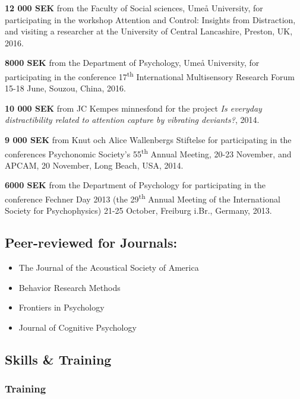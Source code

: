 \documentclass[]{article}
\begin{document}
\textbf{12 000 SEK} from the Faculty of Social sciences, Umeå
University, for participating in the workshop Attention and Control:
Insights from Distraction, and visiting a researcher at the University
of Central Lancashire, Preston, UK, 2016.

\textbf{8000 SEK} from the Department of Psychology, Umeå University,
for participating in the conference 17\textsuperscript{th} International
Multisensory Research Forum 15-18 June, Souzou, China, 2016.

\textbf{10 000 SEK} from JC Kempes minnesfond for the project \emph{Is
everyday distractibility related to attention capture by vibrating
deviants?}, 2014.

\textbf{9 000 SEK} from Knut och Alice Wallenbergs Stiftelse for
participating in the conferences Psychonomic Society's
55\textsuperscript{th} Annual Meeting, 20-23 November, and APCAM, 20
November, Long Beach, USA, 2014.

\textbf{6000 SEK} from the Department of Psychology for participating in
the conference Fechner Day 2013 (the 29\textsuperscript{th} Annual
Meeting of the International Society for Psychophysics) 21-25 October,
Freiburg i.Br., Germany, 2013.

\hypertarget{peer-reviewed-for-journals}{%
\subsection{Peer-reviewed for
Journals:}\label{peer-reviewed-for-journals}}

\begin{itemize}
\item
  The Journal of the Acoustical Society of America
\item
  Behavior Research Methods
\item
  Frontiers in Psychology
\item
  Journal of Cognitive Psychology
\end{itemize}

\hypertarget{skills-training}{%
\subsection{Skills \& Training}\label{skills-training}}

\hypertarget{training}{%
\subsubsection{Training}\label{training}}
\end{document}
